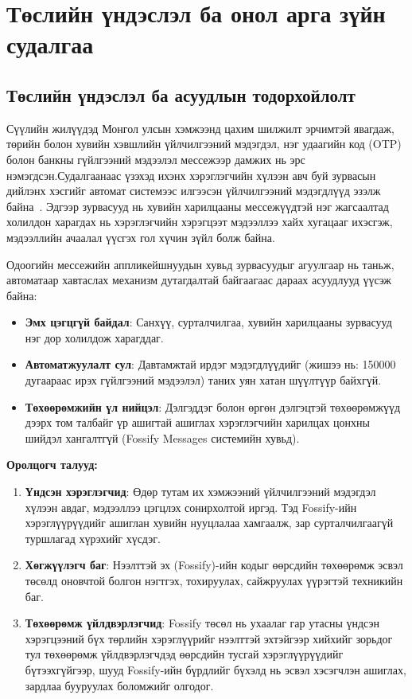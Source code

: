 \chapter{Төслийн үндэслэл ба онол арга зүйн судалгаа}

\section{Төслийн үндэслэл ба асуудлын тодорхойлолт}
Сүүлийн жилүүдэд Монгол улсын хэмжээнд цахим шилжилт эрчимтэй явагдаж, төрийн болон хувийн хэвшлийн үйлчилгээний мэдэгдэл, нэг удаагийн код (OTP) болон банкны гүйлгээний мэдээлэл мессежээр дамжих нь эрс нэмэгдсэн.Судалгаанаас үзэхэд ихэнх хэрэглэгчийн хүлээн авч буй зурвасын дийлэнх хэсгийг автомат системээс илгээсэн үйлчилгээний мэдэгдлүүд эзэлж байна~\cite{idm2026a2p}. Эдгээр зурвасууд нь хувийн харилцааны мессежүүдтэй нэг жагсаалтад холилдон харагдах нь хэрэглэгчийн хэрэгцээт мэдээллээ хайх хугацааг ихэсгэж, мэдээллийн ачаалал \cite{overwhelmed2025} үүсгэх гол хүчин зүйл болж байна.

Одоогийн мессежийн аппликейшнуудын хувьд зурвасуудыг агуулгаар нь таньж, автоматаар хавтаслах механизм дутагдалтай байгаагаас дараах асуудлууд үүсэж байна:
\begin{itemize}
    \item \textbf{Эмх цэгцгүй байдал}: Санхүү, сурталчилгаа, хувийн харилцааны зурвасууд нэг дор холилдож харагддаг.
    \item \textbf{Автоматжуулалт сул}: Давтамжтай ирдэг мэдэгдлүүдийг (жишээ нь: 150000 дугаараас ирэх гүйлгээний мэдээлэл) таних уян хатан шүүлтүүр байхгүй.
    \item \textbf{Төхөөрөмжийн үл нийцэл}: Дэлгэддэг болон өргөн дэлгэцтэй төхөөрөмжүүд дээрх том талбайг үр ашигтай ашиглах хэрэглэгчийн харилцах цонхны шийдэл хангалтгүй (Fossify Messages системийн хувьд).
\end{itemize}

\textbf{Оролцогч талууд:}
\begin{enumerate}
    \item \textbf{Үндсэн хэрэглэгчид}: Өдөр тутам их хэмжээний үйлчилгээний мэдэгдэл хүлээн авдаг, мэдээллээ цэгцлэх сонирхолтой иргэд. Тэд Fossify-ийн хэрэглүүрүүдийг ашиглан хувийн нууцлалаа хамгаалж, зар сурталчилгаагүй туршлагад хүрэхийг хүсдэг.
    \item \textbf{Хөгжүүлэгч баг}: Нээлттэй эх (Fossify)-ийн кодыг өөрсдийн төхөөрөмж эсвэл төсөлд оновчтой болгон нэгтгэх, тохируулах, сайжруулах үүрэгтэй техникийн баг.
    \item \textbf{Төхөөрөмж үйлдвэрлэгчид}: Fossify төсөл нь ухаалаг гар утасны үндсэн хэрэгцээний бүх төрлийн хэрэглүүрийг нээлттэй эхтэйгээр хийхийг зорьдог тул төхөөрөмж үйлдвэрлэгчдэд өөрсдийн тусгай хэрэглүүрүүдийг бүтээхгүйгээр, шууд Fossify-ийн бүрдлийг бүхэлд нь эсвэл хэсэгчлэн ашиглах, зардлаа бууруулах боломжийг олгодог.
\end{enumerate}

